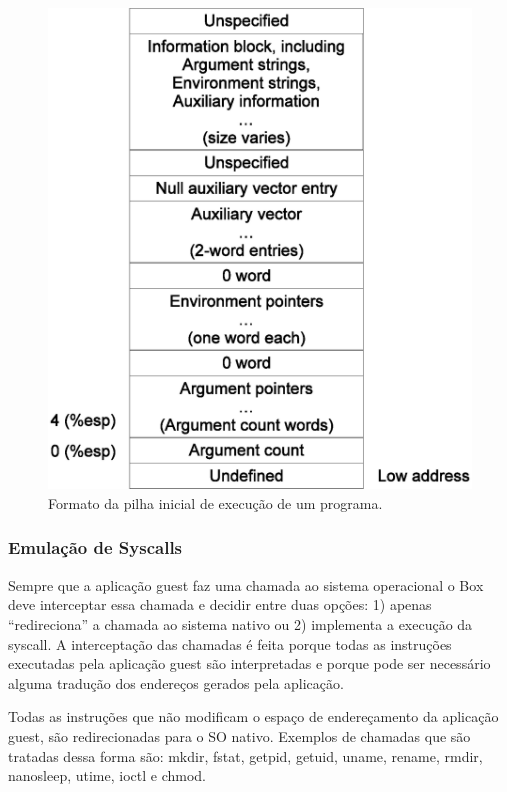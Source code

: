 \documentclass[11pt,twoside]{article}
\begin{document}
\begin{figure}[!h]
  	\begin{center}
    	\includegraphics[scale=0.5]{figures/stack_ini.eps}
	\end{center}
	\caption{Formato da pilha inicial de execução de um programa.}
	\label{fig:stack_ini}
\end{figure}

\subsubsection{Emulação de Syscalls}

Sempre que a aplicação guest faz uma chamada ao sistema operacional o
Box deve interceptar essa chamada e decidir entre duas opções: 1) 
apenas ``redireciona'' a chamada ao sistema nativo ou 2) implementa a 
execução da syscall. A interceptação das chamadas é feita porque todas
as instruções executadas pela aplicação guest são interpretadas e porque
pode ser necessário alguma tradução dos endereços gerados pela aplicação.

Todas as instruções que não modificam o espaço de endereçamento da 
aplicação guest, são redirecionadas para o SO nativo. Exemplos de 
chamadas que são tratadas dessa forma são: mkdir, fstat, getpid, getuid, 
uname, rename, rmdir, nanosleep, utime, ioctl e chmod.
\end{document}
